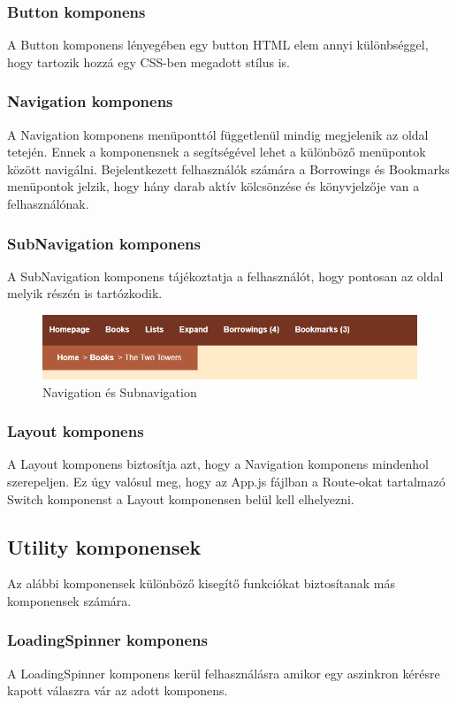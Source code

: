 \subsubsection{Button komponens}
A Button komponens lényegében egy button HTML elem annyi különbséggel, hogy tartozik hozzá egy CSS-ben megadott stílus is.

\subsubsection{Navigation komponens}
A Navigation komponens menüponttól függetlenül mindig megjelenik az oldal tetején. Ennek a komponensnek a segítségével lehet a különböző menüpontok között navigálni. Bejelentkezett felhasználók számára a Borrowings és Bookmarks menüpontok jelzik, hogy hány darab aktív kölcsönzése és könyvjelzője van a felhasználónak. 

\subsubsection{SubNavigation komponens}
A SubNavigation komponens tájékoztatja a felhasználót, hogy pontosan az oldal melyik részén is tartózkodik.

\begin{figure}[H]
    \centering
    \includegraphics[scale=0.6]{images/application/navigation.png}
    \caption{Navigation és Subnavigation}
\end{figure}

\subsubsection{Layout komponens}
A Layout komponens biztosítja azt, hogy a Navigation komponens mindenhol szerepeljen. Ez úgy valósul meg, hogy az App.js fájlban a Route-okat tartalmazó Switch komponenst a Layout komponensen belül kell elhelyezni.

\subsection{Utility komponensek}
Az alábbi komponensek különböző kisegítő funkciókat biztosítanak más komponensek számára.

\subsubsection{LoadingSpinner komponens}
A LoadingSpinner komponens kerül felhasználásra amikor egy aszinkron kérésre kapott válaszra vár az adott komponens.

